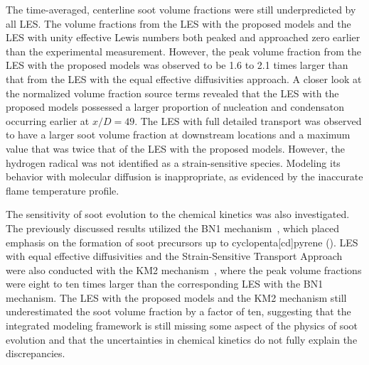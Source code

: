 The time-averaged, centerline soot volume fractions were still underpredicted by all LES. The volume fractions from the LES with the proposed models and the LES with unity effective Lewis numbers both peaked and approached zero earlier than the experimental measurement. However, the peak volume fraction from the LES with the proposed models was observed to be 1.6 to 2.1 times larger than that from the LES with the equal effective diffusivities approach. A closer look at the normalized volume fraction source terms revealed that the LES with the proposed models possessed a larger proportion of nucleation and condensaton occurring earlier at $x/D = 49$. The LES with full detailed transport was observed to have a larger soot volume fraction at downstream locations and a maximum value that was twice that of the LES with the proposed models. However, the hydrogen radical was not identified as a strain-sensitive species. Modeling its behavior with molecular diffusion is inappropriate, as evidenced by the inaccurate flame temperature profile. %

The sensitivity of soot evolution to the chemical kinetics was also investigated. The previously discussed results utilized the BN1 mechanism~\cite{blanquart2009,narayanaswamy2010}, which placed emphasis on the formation of soot precursors up to cyclopenta[cd]pyrene (). LES with equal effective diffusivities and the Strain-Sensitive Transport Approach were also conducted with the KM2 mechanism~\cite{wang2013}, where the peak volume fractions were eight to ten times larger than the corresponding LES with the BN1 mechanism. The LES with the proposed models and the KM2 mechanism still underestimated the soot volume fraction by a factor of ten, suggesting that the integrated modeling framework is still missing some aspect of the physics of soot evolution and that the uncertainties in chemical kinetics do not fully explain the discrepancies.

